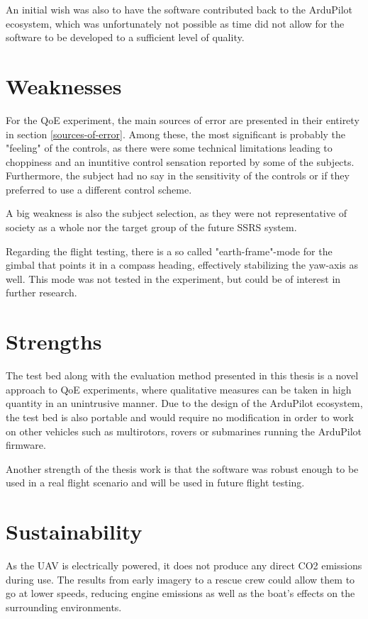 \documentclass[nofilelist]{cslthse-msc}
\begin{document}
An initial wish was also to have the software contributed back to the ArduPilot ecosystem, which was unfortunately not possible as time did not allow for the software to be developed to a sufficient level of quality.

\section{Weaknesses}
For the QoE experiment, the main sources of error are presented in their entirety in section \ref{sources-of-error}. Among these, the most significant is probably the "feeling" of the controls, as there were some technical limitations leading to choppiness and an inuntitive control sensation reported by some of the subjects. Furthermore, the subject had no say in the sensitivity of the controls or if they preferred to use a different control scheme.

A big weakness is also the subject selection, as they were not representative of society as a whole nor the target group of the future SSRS system.   

Regarding the flight testing, there is a so called "earth-frame"-mode for the gimbal that points it in a compass heading, effectively stabilizing the yaw-axis as well. This mode was not tested in the experiment, but could be of interest in further research.

\section{Strengths}
The test bed along with the evaluation method presented in this thesis is a novel approach to QoE experiments, where qualitative measures can be taken in high quantity in an unintrusive manner. Due to the design of the ArduPilot ecosystem, the test bed is also portable and would require no modification in order to work on other vehicles such as multirotors, rovers or submarines running the ArduPilot firmware.

Another strength of the thesis work is that the software was robust enough to be used in a real flight scenario and will be used in future flight testing.

\section{Sustainability}
As the UAV is electrically powered, it does not produce any direct CO2 emissions during use. The results from early imagery to a rescue crew could allow them to go at lower speeds, reducing engine emissions as well as the boat's effects on the surrounding environments. 
\end{document}
